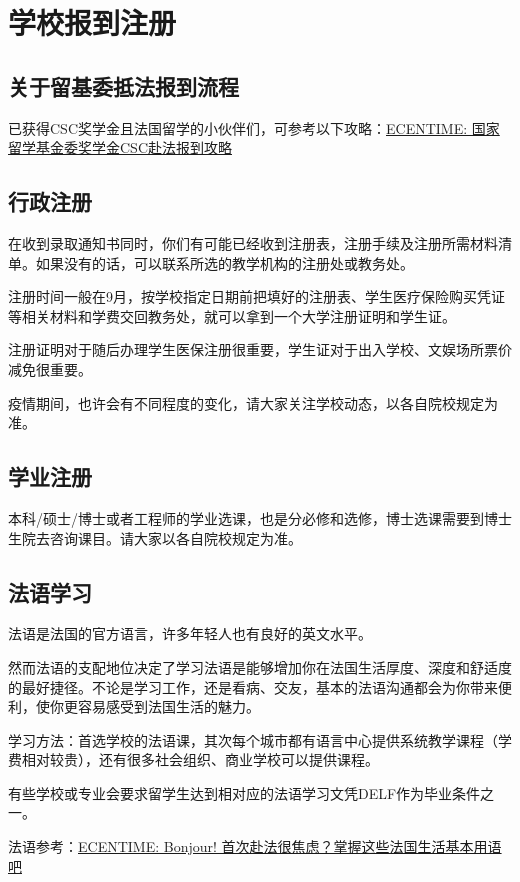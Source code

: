 \section{学校报到注册}
\subsection{关于留基委抵法报到流程}
已获得CSC奖学金且法国留学的小伙伴们，可参考以下攻略：\href{https://www.ecentime.com/article/CSC-China-Scholarship}{ECENTIME: 国家留学基金委奖学金CSC赴法报到攻略} 

\subsection{行政注册}
在收到录取通知书同时，你们有可能已经收到注册表，注册手续及注册所需材料清单。如果没有的话，可以联系所选的教学机构的注册处或教务处。

注册时间一般在9月，按学校指定日期前把填好的注册表、学生医疗保险购买凭证等相关材料和学费交回教务处，就可以拿到一个大学注册证明和学生证。

注册证明对于随后办理学生医保注册很重要，学生证对于出入学校、文娱场所票价减免很重要。

疫情期间，也许会有不同程度的变化，请大家关注学校动态，以各自院校规定为准。

\subsection{学业注册}
本科/硕士/博士或者工程师的学业选课，也是分必修和选修，博士选课需要到博士生院去咨询课目。请大家以各自院校规定为准。

\subsection{法语学习}

法语是法国的官方语言，许多年轻人也有良好的英文水平。

然而法语的支配地位决定了学习法语是能够增加你在法国生活厚度、深度和舒适度的最好捷径。不论是学习工作，还是看病、交友，基本的法语沟通都会为你带来便利，使你更容易感受到法国生活的魅力。

学习方法：首选学校的法语课，其次每个城市都有语言中心提供系统教学课程（学费相对较贵），还有很多社会组织、商业学校可以提供课程。

有些学校或专业会要求留学生达到相对应的法语学习文凭DELF作为毕业条件之一。

法语参考：\href{https://www.ecentime.com/article/francais-quotidien-}{ECENTIME: Bonjour! 首次赴法很焦虑？掌握这些法国生活基本用语吧 }
